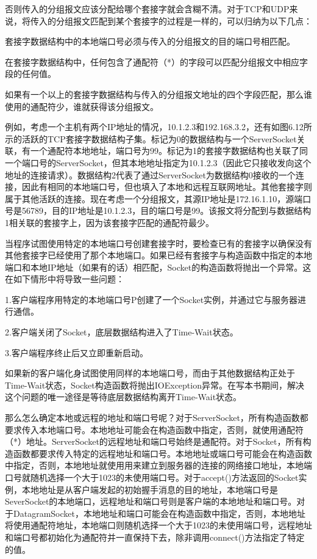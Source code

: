 	否则传入的分组报文应该分配给哪个套接字就会含糊不清。对于TCP和UDP来说，将传入的分组报文匹配到某个套接字的过程是一样的，可以归纳为以下几点：

	套接字数据结构中的本地端口号必须与传入的分组报文的目的端口号相匹配。

	在套接字数据结构中，任何包含了通配符（*）的字段可以匹配分组报文中相应字段的任何值。

	如果有一个以上的套接字数据结构与传入的分组报文地址的四个字段匹配，那么谁使用的通配符少，谁就获得该分组报文。

	例如，考虑一个主机有两个IP地址的情况，10.1.2.3和192.168.3.2，还有如图6.12所示的活跃的TCP套接字数据结构子集。标记为0的数据结构与一个ServerSocket关联，有一个通配符本地地址，端口号为99。标记为1的套接字数据结构也关联了同一个端口号的ServerSocket，但其本地地址指定为10.1.2.3（因此它只接收发向这个地址的连接请求）。数据结构2代表了通过ServerSocket为数据结构0接收的一个连接，因此有相同的本地端口号，但也填入了本地和远程互联网地址。其他套接字则属于其他活跃的连接。现在考虑一个分组报文，其源IP地址是172.16.1.10，源端口号是56789，目的IP地址是10.1.2.3，目的端口号是99。该报文将分配到与数据结构1相关联的套接字上，因为该套接字匹配的通配符最少。

	当程序试图使用特定的本地端口号创建套接字时，要检查已有的套接字以确保没有其他套接字已经使用了那个本地端口。如果已经有套接字与构造函数中指定的本地端口和本地IP地址（如果有的话）相匹配，Socket的构造函数将抛出一个异常。这在如下情形中将导致一些问题：

	1.客户端程序用特定的本地端口号P创建了一个Socket实例，并通过它与服务器进行通信。

	2.客户端关闭了Socket，底层数据结构进入了Time-Wait状态。

	3.客户端程序终止后又立即重新启动。

	如果新的客户端化身试图使用同样的本地端口号，而由于其他数据结构正处于Time-Wait状态，Socket构造函数将抛出IOException异常。在写本书期间，解决这个问题的唯一途径是等待底层数据结构离开Time-Wait状态。

	那么怎么确定本地或远程的地址和端口号呢？对于ServerSocket，所有构造函数都要求传入本地端口号。本地地址可能会在构造函数中指定，否则，就使用通配符（*）地址。ServerSocket的远程地址和端口号始终是通配符。对于Socket，所有构造函数都要求传入特定的远程地址和端口号。本地地址或端口号可能会在构造函数中指定，否则，本地地址就使用用来建立到服务器的连接的网络接口地址，本地端口号就随机选择一个大于1023的未使用端口号。对于accept()方法返回的Socket实例，本地地址是从客户端发起的初始握手消息的目的地址，本地端口号是SeverSocket的本地端口，远程地址和端口号则是客户端的本地地址和端口号。对于DatagramSocket，本地地址和端口可能会在构造函数中指定，否则，本地地址将使用通配符地址，本地端口则随机选择一个大于1023的未使用端口号，远程地址和端口号都初始化为通配符并一直保持下去，除非调用connect()方法指定了特定的值。

